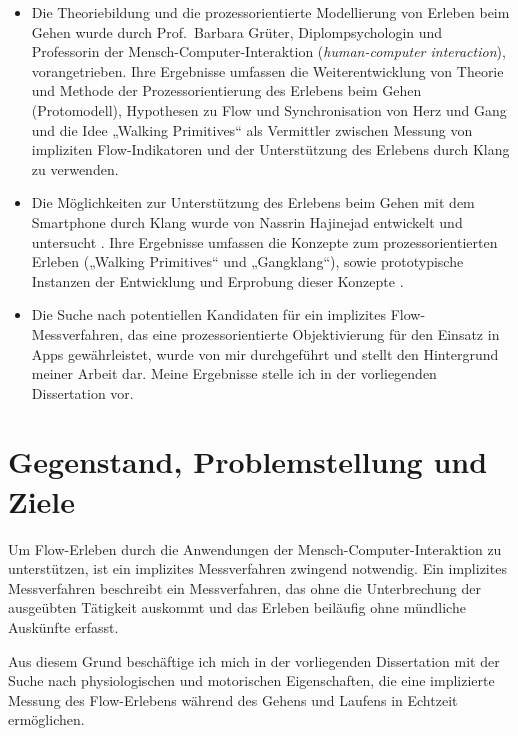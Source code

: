 \begin{itemize}

	\item Die Theoriebildung und die prozessorientierte Modellierung von Erleben beim Gehen wurde durch Prof.\ Barbara Grüter, Diplompsychologin und Professorin der Mensch-Computer-Interaktion (\emph{human-computer interaction}), vorangetrieben. Ihre Ergebnisse umfassen die Weiterentwicklung von Theorie und Methode der Prozessorientierung des Erlebens beim Gehen (Protomodell), Hypothesen zu Flow und Synchronisation von Herz und Gang und die Idee „Walking Primitives“ als Vermittler zwischen Messung von impliziten Flow-Indikatoren und der Unterstützung des Erlebens durch Klang zu verwenden.

	\item Die Möglichkeiten zur Unterstützung des Erlebens beim Gehen mit dem Smartphone durch Klang wurde von Nassrin Hajinejad entwickelt und untersucht \citep{Hajinejad2013}. Ihre Ergebnisse umfassen die Konzepte zum prozessorientierten Erleben („Walking Primitives“ und „Gangklang“), sowie prototypische Instanzen der Entwicklung und Erprobung dieser Konzepte \citep{Hajinejad2015}.

	\item Die Suche nach potentiellen Kandidaten für ein implizites Flow-Messverfahren, das eine prozessorientierte Objektivierung für den Einsatz in Apps gewährleistet, wurde von mir durchgeführt und stellt den Hintergrund meiner Arbeit dar. Meine Ergebnisse stelle ich in der vorliegenden Dissertation vor.

\end{itemize}


\section{Gegenstand, Problemstellung und Ziele} %
\label{sec:gegenstand_problemstellung_und_ziele}

Um Flow-Erleben durch die Anwendungen der Mensch-Computer-Interaktion zu unterstützen, ist ein implizites Messverfahren zwingend notwendig. Ein implizites Messverfahren beschreibt ein Messverfahren, das ohne die Unterbrechung der ausgeübten Tätigkeit auskommt und das Erleben beiläufig ohne mündliche Auskünfte erfasst.

Aus diesem Grund beschäftige ich mich in der vorliegenden Dissertation mit der Suche nach physiologischen und motorischen Eigenschaften, die eine implizierte Messung des Flow-Erlebens während des Gehens und Laufens in Echtzeit ermöglichen. 

